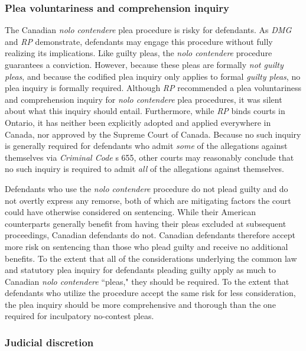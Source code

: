 \subsubsection{Plea voluntariness and comprehension inquiry}

The Canadian \textit{nolo contendere} plea procedure is risky for defendants. As \textit{DMG} and \textit{RP} demonstrate, defendants may engage this procedure without fully realizing its implications. Like guilty pleas, the \textit{nolo contendere} procedure guarantees a conviction. However, because these pleas are formally \textit{not guilty pleas}, and because the codified plea inquiry only applies to formal \textit{guilty pleas}, no plea inquiry is formally required. Although \textit{RP} recommended a plea voluntariness and comprehension inquiry for \textit{nolo contendere} plea procedures, it was silent about what this inquiry should entail. Furthermore, while \textit{RP} binds courts in Ontario, it has neither been explicitly adopted and applied everywhere in Canada, nor approved by the Supreme Court of Canada. Because no such inquiry is generally required for defendants who admit \textit{some} of the allegations against themselves via \textit{Criminal Code} s 655, other courts may reasonably conclude that no such inquiry is required to admit \textit{all} of the allegations against themselves. 

Defendants who use the \textit{nolo contendere} procedure do not plead guilty and do not overtly express any remorse, both of which are mitigating factors the court could have otherwise considered on sentencing. While their American counterparts generally benefit from having their pleas excluded at subsequent proceedings, Canadian defendants do not. Canadian defendants therefore accept more risk on sentencing than those who plead guilty and receive no additional benefits. To the extent that all of the considerations underlying the common law and statutory plea inquiry for defendants pleading guilty apply as much to Canadian \textit{nolo contendere} ``pleas," they should be required. To the extent that defendants who utilize the procedure accept the same risk for less consideration, the plea inquiry should be more comprehensive and thorough than the one required for inculpatory no-contest pleas.

\subsubsection{Judicial discretion}

